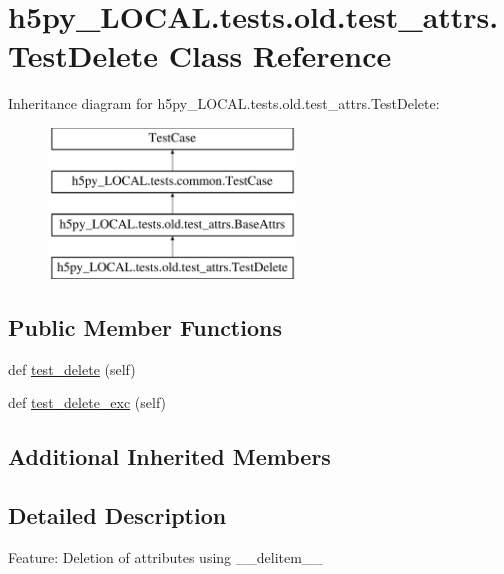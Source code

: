 \hypertarget{classh5py__LOCAL_1_1tests_1_1old_1_1test__attrs_1_1TestDelete}{}\section{h5py\+\_\+\+L\+O\+C\+A\+L.\+tests.\+old.\+test\+\_\+attrs.\+Test\+Delete Class Reference}
\label{classh5py__LOCAL_1_1tests_1_1old_1_1test__attrs_1_1TestDelete}
Inheritance diagram for h5py\+\_\+\+L\+O\+C\+A\+L.\+tests.\+old.\+test\+\_\+attrs.\+Test\+Delete\+:\begin{figure}[H]
\begin{center}
\leavevmode
\includegraphics[height=4.000000cm]{classh5py__LOCAL_1_1tests_1_1old_1_1test__attrs_1_1TestDelete}
\end{center}
\end{figure}
\subsection*{Public Member Functions}
\begin{DoxyCompactItemize}
\item 
def \hyperlink{classh5py__LOCAL_1_1tests_1_1old_1_1test__attrs_1_1TestDelete_a4bfa268cf3b95b7d3478d9f64504bdbe}{test\+\_\+delete} (self)
\item 
def \hyperlink{classh5py__LOCAL_1_1tests_1_1old_1_1test__attrs_1_1TestDelete_aeeb88848cfc61b84c9a24c53975f6147}{test\+\_\+delete\+\_\+exc} (self)
\end{DoxyCompactItemize}
\subsection*{Additional Inherited Members}


\subsection{Detailed Description}
\begin{DoxyVerb}    Feature: Deletion of attributes using __delitem__
\end{DoxyVerb}
 

